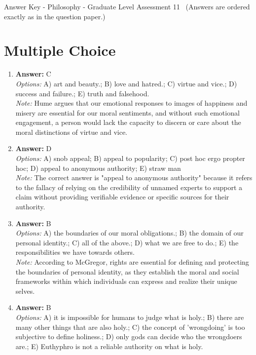\documentclass[12pt]{article}
\begin{document}
\begin{center}
Answer Key - Philosophy - Graduate Level Assessment 11 \
\small (Answers are ordered exactly as in the question paper.)
\end{center}

\section*{Multiple Choice}
\begin{enumerate}[label=\arabic*.]
\item \textbf{Answer:} C
\\ \textit{Options:} A) art and beauty.; B) love and hatred.; C) virtue and vice.; D) success and failure.; E) truth and falsehood.
\\ \textit{Note:} Hume argues that our emotional responses to images of happiness and misery are essential for our moral sentiments, and without such emotional engagement, a person would lack the capacity to discern or care about the moral distinctions of virtue and vice.
\item \textbf{Answer:} D
\\ \textit{Options:} A) snob appeal; B) appeal to popularity; C) post hoc ergo propter hoc; D) appeal to anonymous authority; E) straw man
\\ \textit{Note:} The correct answer is "appeal to anonymous authority" because it refers to the fallacy of relying on the credibility of unnamed experts to support a claim without providing verifiable evidence or specific sources for their authority.
\item \textbf{Answer:} B
\\ \textit{Options:} A) the boundaries of our moral obligations.; B) the domain of our personal identity.; C) all of the above.; D) what we are free to do.; E) the responsibilities we have towards others.
\\ \textit{Note:} According to McGregor, rights are essential for defining and protecting the boundaries of personal identity, as they establish the moral and social frameworks within which individuals can express and realize their unique selves.
\item \textbf{Answer:} B
\\ \textit{Options:} A) it is impossible for humans to judge what is holy.; B) there are many other things that are also holy.; C) the concept of 'wrongdoing' is too subjective to define holiness.; D) only gods can decide who the wrongdoers are.; E) Euthyphro is not a reliable authority on what is holy.

\end{enumerate}
\end{document}
